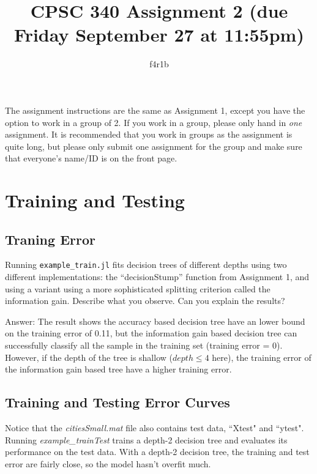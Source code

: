 \documentclass{article}
\def\ans#1{\par\gre{Answer: #1}}
\def\blu#1{{\color{blu}#1}}
\def\gre#1{{\color{gre}#1}}
\begin{document}
\title{CPSC 340 Assignment 2 (due Friday September 27 at 11:55pm)}
\author{f4r1b}
\date{}
\maketitle

The assignment instructions are the same as Assignment 1, except you have the option to work in a group of 2. If you work in a group, please only hand in \emph{one} assignment. It is recommended that you work in groups as the assignment is quite long, but please only submit one assignment for the group and make sure that everyone's name/ID is on the front page.



\section{Training and Testing}

\subsection{Traning Error}

Running \texttt{example\_train.jl} fits decision trees of different depths using two different implementations:
the ``decisionStump'' function from Assignment 1, and using a variant using a more sophisticated splitting criterion called the information gain. \blu{Describe what you observe. Can you explain the results?}
\ans{The result shows the accuracy based decision tree have an lower bound on the training error of 0.11, but the information gain based decision tree can successfully classify all the sample in the training set (training error = 0).\\
However, if the depth of the tree is shallow ($depth \leq 4$ here), the training error of the information gain based tree have a higher training error.}



\subsection{Training and Testing Error Curves}

Notice that the \emph{citiesSmall.mat} file also contains test data, ``Xtest" and ``ytest". 
Running \emph{example\_trainTest} trains a depth-2 decision tree and evaluates its performance on the test data. %
With a depth-2 decision tree, the training and test error are fairly close, so the model hasn't overfit much.
\end{document}
